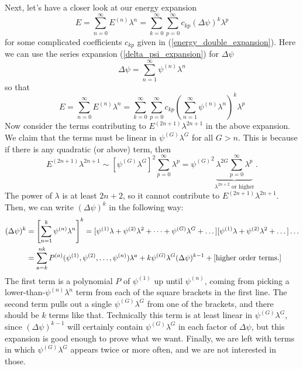 \documentclass{article}
\theoremstyle{plain}\theoremheaderfont{\normalfont\itshape}\theorembodyfont{\rmfamily}\theoremseparator{.}\newtheorem*{rem}{Remark}\newtheorem*{ex}{Example}\newtheorem*{proof}{Proof}\newtheorem*{altp}{Alternative proof}
\theoremstyle{plain}\theoremheaderfont{\normalfont\bfseries}\theorembodyfont{\rmfamily}\theoremseparator{.}\newtheorem{thm}{Theorem}[section]\newtheorem{lem}[thm]{Lemma}\newtheorem{prop}[thm]{Proposition}\newtheorem*{cor}{Corollary}\newtheorem{defn}[thm]{Definition}\newtheorem{clm}[thm]{Claim}\newtheorem{clminproof}{Claim}
\theoremstyle{break}\theoremheaderfont{\normalfont\itshape}\theorembodyfont{\rmfamily}\theoremseparator{.\medskip}\newtheorem*{proofskip}{Proof}\newtheorem*{exs}{Examples}\newtheorem*{rems}{Remarks}
\theoremstyle{break}\theoremheaderfont{\normalfont\bfseries}\theorembodyfont{\rmfamily}\theoremseparator{.\medskip}\newtheorem{lemskip}[thm]{Lemma}\newtheorem{defnskip}[thm]{Definition}\newtheorem{propskip}[thm]{Proposition}\newtheorem{thmskip}[thm]{Theorem}
\numberwithin{equation}{section}
\begin{document}
    Next, let's have a closer look at our energy expansion
    \begin{equation}
        E=\sum_{n=0}^{\infty}E^{(n)}\lambda^n=\sum_{k=0}^{\infty}\sum_{p=0}^{\infty}c_{kp}(\Delta\psi)^k\lambda^p
    \end{equation}
    for some complicated coefficients \(c_{kp}\) given in (\ref{energy_double_expansion}). Here we can use the series expansion (\ref{delta_psi_expansion}) for \(\Delta\psi\)
    \begin{equation}
        \Delta\psi=\sum_{n=1}^{\infty}\psi^{(n)}\lambda^n
    \end{equation}
    so that
    \begin{equation}
        E=\sum_{n=0}^{\infty}E^{(n)}\lambda^n=\sum_{k=0}^{\infty}\sum_{p=0}^{\infty}c_{kp}\left(\sum_{n=1}^{\infty}\psi^{(n)}\lambda^n\right)^k\lambda^p
    \end{equation}
    Now consider the terms contributing to \(E^{(2n+1)}\lambda^{2n+1}\) in the above expansion. We claim that the terms must be linear in \(\psi^{(G)}\lambda^G\) for all \(G>n\). This is because if there is any quadratic (or above) term, then
    \begin{equation}
        E^{(2n+1)}\lambda^{2n+1}\sim[\psi^{(G)}\lambda^G]^2\sum_{p=0}^{\infty}\lambda^p={\psi^{(G)}}^2\underbrace{\lambda^{2G}\sum_{p=0}^{\infty}\lambda^p}_{\lambda^{2n+2}\text{ or higher}}\,.
    \end{equation}
    The power of \(\lambda\) is at least \(2n+2\), so it cannot contribute to \(E^{(2n+1)}\lambda^{2n+1}\). Then, we can write \((\Delta\psi)^k\) in the following way:
    \begin{align}
        (\Delta\psi)^k&=\left[\sum_{n=1}^{k}\psi^{(n)}\lambda^n\right]^k=[\psi^{(1)}\lambda+\psi^{(2)}\lambda^2+\dots+\psi^{(G)}\lambda^G+\dots][\psi^{(1)}\lambda+\psi^{(2)}\lambda^2+\dots]\dots \notag\\
        &=\sum_{a=k}^{nk}P^{(a)}(\psi^{(1)},\psi^{(2)},\dots,\psi^{(n)})\lambda^a + k\psi^{(G)}\lambda^{G}(\Delta\psi)^{k-1}+[\text{higher order terms.}]
    \end{align}
    The first term is a polynomial \(P\) of \(\psi^{(1)}\) up until \(\psi^{(n)}\), coming from picking a lower-than-\(\psi^{(n)}\lambda^n\) term from each of the square brackets in the first line. The second term pulls out a single \(\psi^{(G)}\lambda^G\) from one of the brackets, and there should be \(k\) terms like that. Technically this term is at least linear in \(\psi^{(G)}\lambda^G\), since \((\Delta\psi)^{k-1}\) will certainly contain \(\psi^{(G)}\lambda^G\) in each factor of \(\Delta\psi\), but this expansion is good enough to prove what we want. Finally, we are left with terms in which \(\psi^{(G)}\lambda^G\) appears twice or more often, and we are not interested in those.
\end{document}
